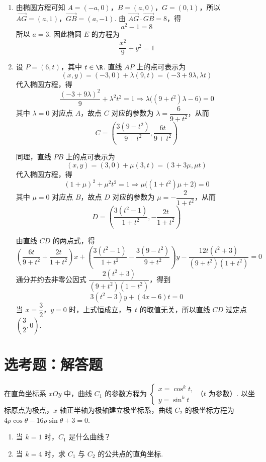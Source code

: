 \begin{solution}
\begin{enumerate}
\item 由椭圆方程可知 \(A=(-a,0)\)，\(B=(a,0)\)，\(G=(0,1)\)，所以
\(\overrightarrow{AG}=(a,1)\)，\(\overrightarrow{GB}=(a,-1)\).
由 \(\overrightarrow{AG}\cdot\overrightarrow{GB}=8\)，得
\[
a^2-1=8
\]
所以 \(a=3\). 因此椭圆 \(E\) 的方程为
\[
\dfrac{x^2}{9}+y^2=1
\]

\item 设 \(P=(6,t)\)，其中 \(t\in\R\). 直线 \(AP\) 上的点可表示为
\[
(x,y)=(-3,0)+\lambda(9,t)=(-3+9\lambda,\lambda t)
\]
代入椭圆方程，得
\[
\dfrac{(-3+9\lambda)^2}{9}+\lambda^2t^2=1
\Longrightarrow \lambda\bigl((9+t^2)\lambda-6\bigr)=0
\]
其中 \(\lambda=0\) 对应点 \(A\)，故点 \(C\) 对应的参数为 \(\lambda=\dfrac{6}{9+t^2}\)，从而
\[
C=\left(\dfrac{3(9-t^2)}{9+t^2},\dfrac{6t}{9+t^2}\right)
\]

同理，直线 \(PB\) 上的点可表示为
\[
(x,y)=(3,0)+\mu(3,t)=(3+3\mu,\mu t)
\]
代入椭圆方程，得
\[
(1+\mu)^2+\mu^2t^2=1
\Longrightarrow \mu\bigl((1+t^2)\mu+2\bigr)=0
\]
其中 \(\mu=0\) 对应点 \(B\)，故点 \(D\) 对应的参数为 \(\mu=-\dfrac{2}{1+t^2}\)，从而
\[
D=\left(\dfrac{3(t^2-1)}{1+t^2},-\dfrac{2t}{1+t^2}\right)
\]

由直线 \(CD\) 的两点式，得
\[
\left(\dfrac{6t}{9+t^2}+\dfrac{2t}{1+t^2}\right)x
+\left(\dfrac{3(t^2-1)}{1+t^2}-\dfrac{3(9-t^2)}{9+t^2}\right)y
-\dfrac{12t(t^2+3)}{(9+t^2)(1+t^2)}=0
\]
通分并约去非零公因式 \(\dfrac{2(t^2+3)}{(9+t^2)(1+t^2)}\)，得到
\[
3(t^2-3)y+(4x-6)t=0
\]
当 \(x=\dfrac32\)，\(y=0\) 时，上式恒成立，与 \(t\) 的取值无关，所以直线 \(CD\) 过定点 \(\left(\dfrac32,0\right)\).
\end{enumerate}
\end{solution}

\section{选考题：解答题}

\begin{problem}
在直角坐标系 \(xOy\) 中，曲线 \(C_1\) 的参数方程为 \(\begin{cases}
x=\cos^k t,\\
y=\sin^k t
\end{cases}\)（\(t\) 为参数）. 以坐标原点为极点，\(x\) 轴正半轴为极轴建立极坐标系，曲线 \(C_2\) 的极坐标方程为 \(4\rho\cos\theta-16\rho\sin\theta+3=0\).

\begin{enumerate}
\item 当 \(k=1\) 时，\(C_1\) 是什么曲线？

\item 当 \(k=4\) 时，求 \(C_1\) 与 \(C_2\) 的公共点的直角坐标.
\end{enumerate}
\end{problem}

